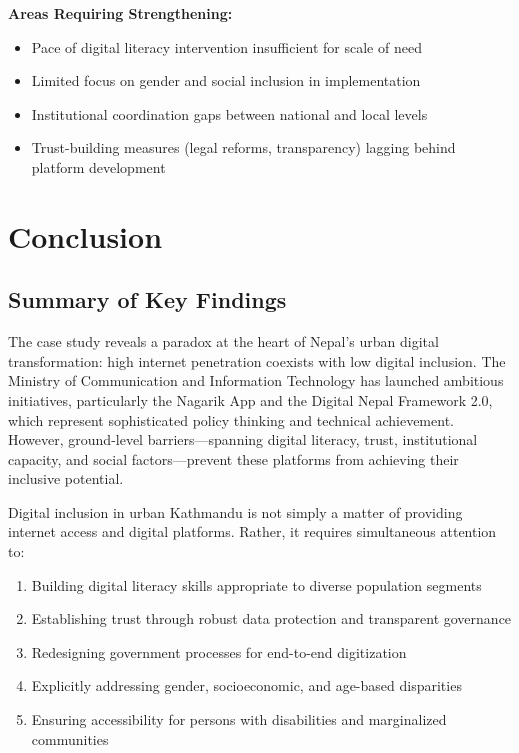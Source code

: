 \documentclass[12pt,a4paper]{article}
\begin{document}
\textbf{Areas Requiring Strengthening:}
\begin{itemize}
    \item Pace of digital literacy intervention insufficient for scale of need
    \item Limited focus on gender and social inclusion in implementation
    \item Institutional coordination gaps between national and local levels
    \item Trust-building measures (legal reforms, transparency) lagging behind platform development
\end{itemize}

\newpage
\section{Conclusion}
\label{sec:conclusion}

\subsection{Summary of Key Findings}

The case study reveals a paradox at the heart of Nepal's urban digital transformation: high internet penetration coexists with low digital inclusion. The Ministry of Communication and Information Technology has launched ambitious initiatives, particularly the Nagarik App and the Digital Nepal Framework 2.0, which represent sophisticated policy thinking and technical achievement. However, ground-level barriers—spanning digital literacy, trust, institutional capacity, and social factors—prevent these platforms from achieving their inclusive potential.

Digital inclusion in urban Kathmandu is not simply a matter of providing internet access and digital platforms. Rather, it requires simultaneous attention to:
\begin{enumerate}
    \item Building digital literacy skills appropriate to diverse population segments
    \item Establishing trust through robust data protection and transparent governance
    \item Redesigning government processes for end-to-end digitization
    \item Explicitly addressing gender, socioeconomic, and age-based disparities
    \item Ensuring accessibility for persons with disabilities and marginalized communities
\end{enumerate}
\end{document}
